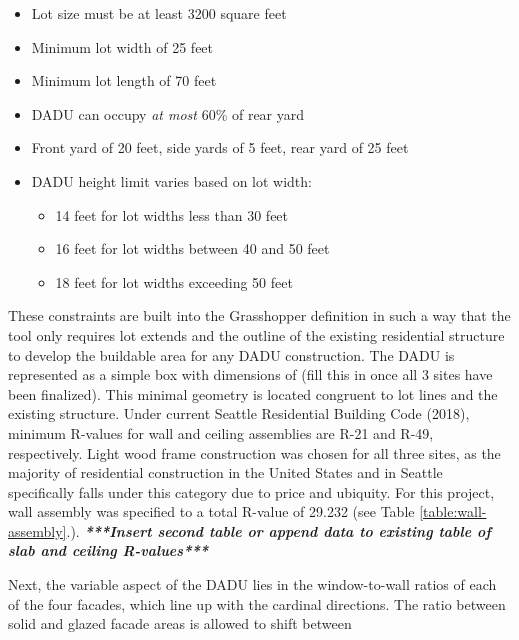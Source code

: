 \documentclass[sagev,doublespace,times,Review]{sagej}
\begin{document}
\begin{itemize}
	\item Lot size must be at least 3200 square feet
	\item Minimum lot width of 25 feet
	\item Minimum lot length of 70 feet
	\item DADU can occupy \textit{at most} 60\% of rear yard	
	\item Front yard of 20 feet, side yards of 5 feet, rear yard of 25  feet
	\item DADU height limit varies based on lot width: \begin{itemize}
	\item 14 feet for lot widths less than 30 feet
	\item 16 feet for lot widths between 40 and 50 feet
	\item 18 feet for lot widths exceeding 50 feet \end{itemize}
\end{itemize}

These constraints are built into the Grasshopper definition in such a way that the tool only requires lot extends and the outline of the existing residential structure to develop the buildable area for any DADU construction. The DADU is represented as a simple box with dimensions of (fill this in once all 3 sites have been finalized). This minimal geometry is located congruent to lot lines and the existing structure. Under current Seattle Residential Building Code (2018), minimum R-values for wall and ceiling assemblies are R-21 and R-49, respectively. Light wood frame construction was chosen for all three sites, as the majority of residential construction in the United States and in Seattle specifically falls under this category due to price and ubiquity. For this project, wall assembly was specified to a total R-value of 29.232 (see Table \ref{table:wall-assembly}.). 
\textit{\textbf{***Insert second table or append data to existing table of slab and ceiling R-values***}}

Next, the variable aspect of the DADU lies in the window-to-wall ratios of each of the four facades, which line up with the cardinal directions. The ratio between solid and glazed facade areas is allowed to shift between 
\end{document}
